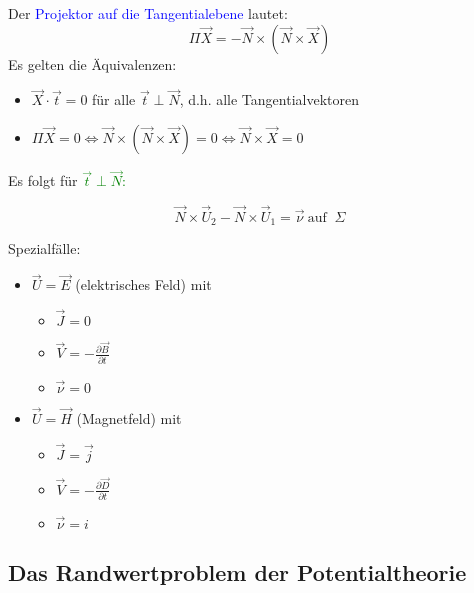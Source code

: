 \documentclass[]{article}
\begin{document}
	Der \textcolor{blue}{Projektor auf die Tangentialebene} lautet:
	$$\Pi \vec{X}= -\vec{N}\times(\vec{N}\times \vec{X})$$
	Es gelten die Äquivalenzen: 
	
	\begin{itemize}
		\item 
			$\vec{X}\cdot \vec{t}=0$ für alle $\vec{t}\perp \vec{N}$, d.h. alle Tangentialvektoren
		\item 
			$\Pi\vec{X}=0 \Leftrightarrow  \vec{N}\times(\vec{N}\times \vec{X})=0 \Leftrightarrow \vec{N}\times \vec{X}=0$
	\end{itemize}

\newpage

 	Es folgt für \textcolor{green}{$\vec{t}\perp \vec{N}$: }
	
	\begin{center}
		\begin{boxedminipage}[green]{7cm}
			\begin{displaymath}
				\vec{N}\times \vec{U}_2-\vec{N}\times \vec{U}_1= \vec{\nu} \ \text{auf } \ \Sigma\end{displaymath} 
		\end{boxedminipage}
	\end{center}
	
	Spezialfälle:

	\begin{multicols}{2}
		\begin{itemize}
			\item 
				$\vec{U}=\vec{E}$ (elektrisches Feld) mit 
				\begin{itemize}
					\item 
						$\vec{J}=0$
					\item 
						$\vec{V}=-\frac{∂\vec{B}}{∂t}$
					\item 
						$\vec{\nu}=0$
				\end{itemize}
			\item 
				$\vec{U}=\vec{H}$ (Magnetfeld) mit
				\begin{itemize}
					\item 
						$\vec{J}=\vec{j}$
					\item 
						$\vec{V}=-\frac{∂\vec{D}}{∂t}$
					\item 
						$\vec{\nu}=i$
				\end{itemize}
		\end{itemize}
	\end{multicols}	

\newpage

\subsection{Das Randwertproblem der Potentialtheorie}
\end{document}

